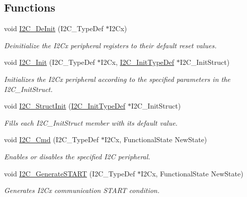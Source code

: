 \subsection*{Functions}
\begin{DoxyCompactItemize}
\item 
void \hyperlink{group___i2_c_ga2ee214364603059ad5d9089f749f5bfd}{I2\-C\-\_\-\-De\-Init} (I2\-C\-\_\-\-Type\-Def $\ast$I2\-Cx)
\begin{DoxyCompactList}\small\item\em Deinitialize the I2\-Cx peripheral registers to their default reset values. \end{DoxyCompactList}\item 
void \hyperlink{group___i2_c_gaac29465bca70fbc91c2f922ab67bb88e}{I2\-C\-\_\-\-Init} (I2\-C\-\_\-\-Type\-Def $\ast$I2\-Cx, \hyperlink{struct_i2_c___init_type_def}{I2\-C\-\_\-\-Init\-Type\-Def} $\ast$I2\-C\-\_\-\-Init\-Struct)
\begin{DoxyCompactList}\small\item\em Initializes the I2\-Cx peripheral according to the specified parameters in the I2\-C\-\_\-\-Init\-Struct. \end{DoxyCompactList}\item 
void \hyperlink{group___i2_c_ga08582aca6d7d7910cd5cbff0d9def350}{I2\-C\-\_\-\-Struct\-Init} (\hyperlink{struct_i2_c___init_type_def}{I2\-C\-\_\-\-Init\-Type\-Def} $\ast$I2\-C\-\_\-\-Init\-Struct)
\begin{DoxyCompactList}\small\item\em Fills each I2\-C\-\_\-\-Init\-Struct member with its default value. \end{DoxyCompactList}\item 
void \hyperlink{group___i2_c_ga7e1323c9133c2cb424dfb5b10b7d2f0b}{I2\-C\-\_\-\-Cmd} (I2\-C\-\_\-\-Type\-Def $\ast$I2\-Cx, Functional\-State New\-State)
\begin{DoxyCompactList}\small\item\em Enables or disables the specified I2\-C peripheral. \end{DoxyCompactList}\item 
void \hyperlink{group___i2_c_ga36c522b471588be9779c878222ccb20f}{I2\-C\-\_\-\-Generate\-S\-T\-A\-R\-T} (I2\-C\-\_\-\-Type\-Def $\ast$I2\-Cx, Functional\-State New\-State)
\begin{DoxyCompactList}\small\item\em Generates I2\-Cx communication S\-T\-A\-R\-T condition. \end{DoxyCompactList}\item 

\end{DoxyCompactItemize}
